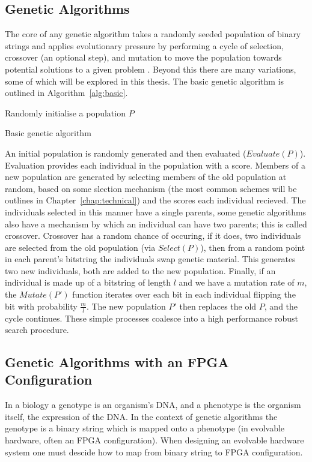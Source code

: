 \subsection{Genetic Algorithms}
The core of any genetic algorithm takes a randomly seeded population of binary strings
and applies
evolutionary pressure by performing a cycle of selection, crossover (an optional
step), and mutation
to move the population towards potential solutions to a given problem \cite{Goldberg:1989:GAS:534133}.
Beyond this there are many
variations, some of which will be explored in this thesis. The basic genetic algorithm is
outlined in Algorithm~\ref{alg:basic}.

\begin{algorithm}
	Randomly initialise a population $P$
	\caption{Basic genetic algorithm}
	\label{alg:basic}
\end{algorithm}

An initial population is randomly generated and then
evaluated ($Evaluate(P)$). Evaluation provides each individual in the population with a score.
Members of a new population are generated by selecting members of the old population
at random, based on some slection mechanism (the most common schemes will be outlines
in Chapter~\ref{chap:technical}) and the scores each individual recieved. The individuals
selected in this manner have a single parents, some genetic algorithms also have a mechanism
by which an individual can have two parents; this is called crossover. Crossover has a
random chance of occuring, if it does, two individuals are selected from the old
population (via $Select(P)$), then from a random point in each parent's bitstring the
individuals swap
genetic material. This generates two new individuals, both are added to the
new population.
Finally, if an individual is made up of a bitstring of length $l$ and we have a mutation rate
of $m$, the $Mutate(P')$ function iterates over each bit in each individual flipping the bit with
probability $\frac{m}{l}$. The new population $P'$ then replaces the old $P$, and the cycle continues.
These simple processes coalesce into a high performance robust search
procedure.

\subsection{Genetic Algorithms with an FPGA Configuration}
In a biology a genotype is an organism's DNA, and a phenotype is
the organism itself, the expression of the DNA. In the context of genetic algorithms
the genotype is a binary string which is mapped onto a phenotype (in evolvable
hardware, often an FPGA configuration). When designing an evolvable hardware
system one must descide how to map from binary string to FPGA configuration.

